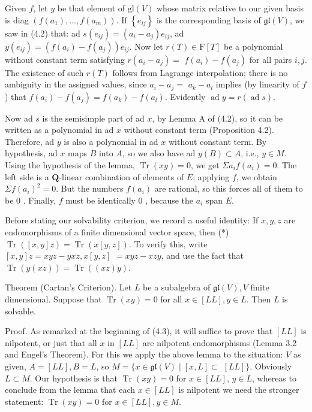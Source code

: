 \documentclass[10pt]{article}
\begin{document}
Given $f$, let $y$ be that element of $\mathrm{gl}(V)$ whose matrix relative to our given basis is diag $\left(f\left(a_{1}\right), \ldots, f\left(a_{m}\right)\right)$. If $\left\{e_{i j}\right\}$ is the corresponding basis of $\mathfrak{g l}(V)$, we saw in (4.2) that: ad $s\left(e_{i j}\right)=\left(a_{i}-a_{j}\right) e_{i j}$, ad $y\left(e_{i j}\right)=\left(f\left(a_{i}\right)-f\left(a_{j}\right)\right) e_{i j}$. Now let $r(T) \in \mathrm{F}[T]$ be a polynomial without constant term satisfying $r\left(a_{i}-a_{j}\right)=$ $f\left(a_{i}\right)-f\left(a_{j}\right)$ for all pairs $i, j$. The existence of such $r(T)$ follows from Lagrange interpolation; there is no ambiguity in the assigned values, since $a_{i}-a_{j}=$ $a_{k}-a_{l}$ implies (by linearity of $f$ ) that $f\left(a_{i}\right)-f\left(a_{j}\right)=f\left(a_{k}\right)-f\left(a_{l}\right)$. Evidently $\operatorname{ad} y=r(\operatorname{ad} s)$.

Now ad $s$ is the semisimple part of ad $x$, by Lemma A of (4.2), so it can be written as a polynomial in ad $x$ without constant term (Proposition 4.2). Therefore, ad $y$ is also a polynomial in ad $x$ without constant term. By hypothesis, ad $x$ maps $B$ into $A$, so we also have ad $y(B) \subset A$, i.e., $y \in M$. Using the hypothesis of the lemma, $\operatorname{Tr}(x y)=0$, we get $\Sigma a_{i} f\left(a_{i}\right)=0$. The left side is a $\mathbf{Q}$-linear combination of elements of $E$; applying $f$, we obtain $\Sigma f\left(a_{i}\right)^{2}=0$. But the numbers $f\left(a_{i}\right)$ are rational, so this forces all of them to be 0 . Finally, $f$ must be identically 0 , because the $a_{i}$ span $E$.

Before stating our solvability criterion, we record a useful identity: If $x, y, z$ are endomorphisms of a finite dimensional vector space, then (*) $\operatorname{Tr}([x, y] z)=\operatorname{Tr}(x[y, z])$. To verify this, write $[x, y] z=x y z-y x z, x[y, z]$ $=x y z-x z y$, and use the fact that $\operatorname{Tr}(y(x z))=\operatorname{Tr}((x z) y)$.

Theorem (Cartan's Criterion). Let $L$ be a subalgebra of $\mathfrak{g l}(V), V$ finite dimensional. Suppose that $\operatorname{Tr}(x y)=0$ for all $x \in[L L], y \in L$. Then $L$ is solvable.

Proof. As remarked at the beginning of (4.3), it will suffice to prove that $[L L]$ is nilpotent, or just that all $x$ in $[L L]$ are nilpotent endomorphisms (Lemma 3.2 and Engel's Theorem). For this we apply the above lemma to the situation: $V$ as given, $A=[L L], B=L$, so $M=\{x \in \mathfrak{g l}(V) \mid[x, L] \subset$ $[L L]\}$. Obviously $L \subset M$. Our hypothesis is that $\operatorname{Tr}(x y)=0$ for $x \in[L L]$, $y \in L$, whereas to conclude from the lemma that each $x \in[L L]$ is nilpotent we need the stronger statement: $\operatorname{Tr}(x y)=0$ for $x \in[L L], y \in M$.
\end{document}
